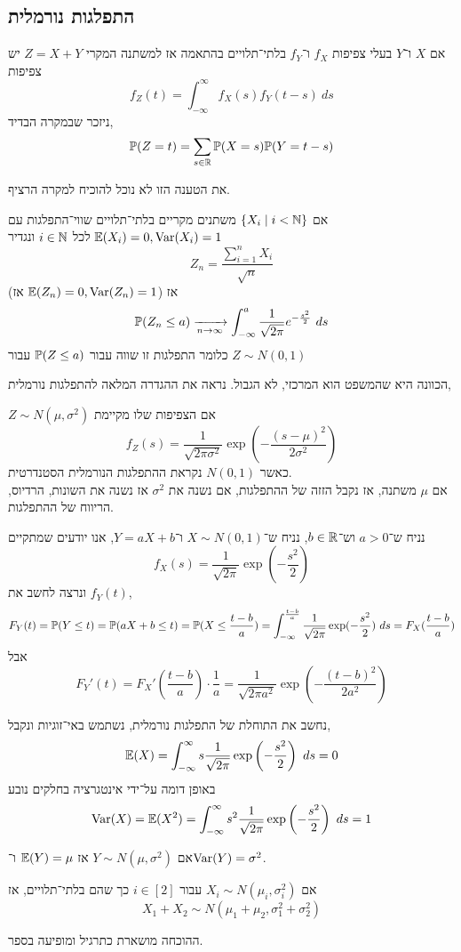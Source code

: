 \subsection{התפלגות נורמלית}
\begin{proposition}
	אם $X$ ו־$Y$ בעלי צפיפות $f_X$ ו־$f_Y$ בלתי־תלויים בהתאמה אז למשתנה המקרי $Z = X + Y$ יש צפיפות
	\[
		f_Z(t)
		= \int_{-\infty}^{\infty} f_X(s) f_Y(t - s)\ ds
	\]
	ניזכר שבמקרה הבדיד,
	\[
		\mathbb{P}(Z = t)
		= \sum_{s \in \mathbb{R}} \mathbb{P}(X = s) \mathbb{P}(Y = t - s)
	\]
\end{proposition}
את הטענה הזו לא נוכל להוכיח למקרה הרציף.
\begin{theorem}\label{central_limit_theorem}
	אם $\{ X_i \mid i < \mathbb{N} \}$ משתנים מקריים בלתי־תלויים שווי־התפלגות עם $\mathbb{E}(X_i) = 0, \operatorname{Var}(X_i) = 1$ לכל $i \in \mathbb{N}$ ונגדיר
	\[
		Z_n = \frac{\sum_{i = 1}^{n} X_i}{\sqrt{n}}
	\]
	(אז $\mathbb{E}(Z_n) = 0, \operatorname{Var}(Z_n) = 1$)
	אז
	\[
		\mathbb{P}(Z_n \le a) \xrightarrow[n \to \infty]{} \int_{-\infty}^{a} \frac{1}{\sqrt{2\pi}} e^{-\frac{s^2}{2}}\ ds
	\]
	כלומר התפלגות זו שווה עבור $\mathbb{P}(Z \le a)$ עבור $Z \sim N(0, 1)$
\end{theorem}
הכוונה היא שהמשפט הוא המרכזי, לא הגבול.
נראה את ההגדרה המלאה להתפלגות נורמלית,
\begin{definition}
	$Z \sim N(\mu, \sigma^2)$ אם הצפיפות שלו מקיימת
	\[
		f_Z(s) = \frac{1}{\sqrt{2\pi \sigma^2}} \exp\left(-\frac{{(s - \mu)}^2}{2\sigma^2}\right)
	\]
	כאשר $N(0, 1)$ נקראת ההתפלגות הנורמלית הסטנדרטית. \\
	אם $\mu$ משתנה, אז נקבל הזזה של ההתפלגות, אם נשנה את $\sigma^2$ אז נשנה את השונות, הרדיוס, הריווח של ההתפלגות.
\end{definition}
\begin{example}
	נניח ש־$a > 0$ וש־$b \in \mathbb{R}$, נניח ש־$X \sim N(0, 1)$ ו־$Y = aX + b$, אנו יודעים שמתקיים
	\[
		f_X(s)
		= \frac{1}{\sqrt{2 \pi}} \exp(-\frac{s^2}{2})
	\]
	ונרצה לחשב את $f_Y(t)$,
	\[
		F_Y(t)
		= \mathbb{P}(Y \le t)
		= \mathbb{P}(aX + b \le t)
		= \mathbb{P}(X \le \frac{t - b}{a})
		= \int_{-\infty}^{\frac{t - b}{a}} \frac{1}{\sqrt{2 \pi}} \exp(-\frac{s^2}{2})\ ds
		= F_X(\frac{t - b}{a})
	\]
	אבל
	\[
		F_Y'(t)
		= F_X'\left(\frac{t - b}{a}\right) \cdot \frac{1}{a}
		= \frac{1}{\sqrt{2\pi a^2}} \exp\left(- \frac{{(t - b)}^2}{2a^2}\right)
	\]
\end{example}
\begin{example}
	נחשב את התוחלת של התפלגות נורמלית, נשתמש באי־זוגיות ונקבל,
	\[
		\mathbb{E}(X)
		= \int_{-\infty}^{\infty} s \frac{1}{\sqrt{2 \pi}} \exp\left(- \frac{s^2}{2}\right)\ ds
		= 0
	\]
	באופן דומה על־ידי אינטגרציה בחלקים נובע
	\[
		\operatorname{Var}(X)
		= \mathbb{E}(X^2)
		= \int_{-\infty}^{\infty} s^2 \frac{1}{\sqrt{2\pi}} \exp\left(- \frac{s^2}{2}\right)\ ds
		= 1
	\]
\end{example}
\begin{conclusion}
	אם $Y \sim N(\mu, \sigma^2)$ אז $\mathbb{E}(Y) = \mu$ ו־$\operatorname{Var}(Y) = \sigma^2$.
\end{conclusion}
\begin{proposition}
	אם $X_i \sim N(\mu_i, \sigma_i^2)$ עבור $i \in [2]$ כך שהם בלתי־תלויים, אז
	\[
		X_1 + X_2
		\sim N(\mu_1 + \mu_2, \sigma_1^2 + \sigma_2^2)
	\]
\end{proposition}
ההוכחה מושארת כתרגיל ומופיעה בספר.

